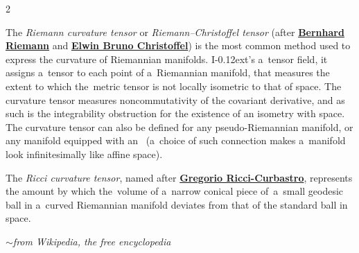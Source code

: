 \begin{changemargin}{2\parindent}{\parindent}
\bgroup %
\setlength{\parindent}{\negparindent}
\setlength{\parskip}{0.8mm minus0.2mm}
\small

\leavevmode{\indent}The \emph{Riemann curvature tensor} or \emph{Riemann\hbox{--}Christoffel tensor} (after \href{https://en.wikipedia.org/wiki/Bernhard_Riemann}{\textbf{Bernhard Riemann}} and \href{https://en.wikipedia.org/wiki/Elwin_Bruno_Christoffel}{\textbf{Elwin Bruno Christoffel}}) is the most common method used to express the curvature of Riemannian manifolds. I\kern-0.12ext’s a~tensor field, it assigns a~tensor to each point of a~Riemannian manifold, that measures the extent to which the~metric tensor is not locally isometric to that of  space. The curvature tensor measures noncommutativity of the covariant derivative, and as such is the integrability obstruction for the existence of an isometry with  space. The curvature tensor can also be defined for any pseudo-Riemannian manifold, or any manifold equipped with an~ (a~choice of such connection makes a~manifold look infinitesimally like affine  space).

The \emph{Ricci curvature tensor}, named after \href{https://en.wikipedia.org/wiki/Gregorio_Ricci-Curbastro}{\textbf{Gregorio Ricci\hbox{-}Curbastro}}, represents the amount by which the~volume of a~narrow conical piece of~a~small geodesic ball in a~curved Riemannian manifold deviates from that of the standard ball in  space.

\vspace{.2em}
\hfill $\sim$\:\emph{from Wikipedia, the free encyclopedia}
\par
\egroup
\nopagebreak\vspace{.12em}
\end{changemargin}


